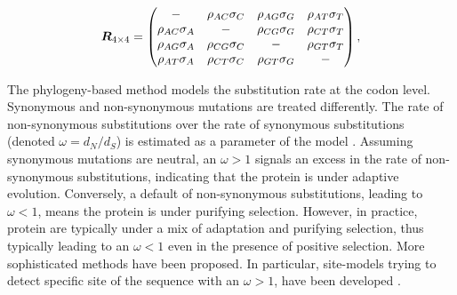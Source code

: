 \begin{equation}
\label{eq:mutrates}
\bm{R}_{4\times4} = \begin{pmatrix}
- & {\rho_{AC} \sigma_C} & {\rho_{AG}\sigma_G} & {\rho_{AT}\sigma_T} \\ 
{\rho_{AC}\sigma_A} & - & {\rho_{CG}\sigma_G} & {\rho_{CT}\sigma_T} \\ 
{\rho_{AG}\sigma_A} & {\rho_{CG}\sigma_C} & - & {\rho_{GT}\sigma_T} \\ 
{\rho_{AT}\sigma_A} & {\rho_{CT}\sigma_C} & {\rho_{GT}\sigma_G} & - 
\end{pmatrix},
\end{equation}

The phylogeny-based method models the \gls{substitution} rate at the \gls{codon} level. Synonymous and non-synonymous mutations are treated differently. The rate of non-synonymous substitutions over the rate of synonymous substitutions (denoted $\omega=d_N/d_S$) is estimated as a parameter of the model \citep{Muse1994,Goldman1994}. Assuming synonymous mutations are \gls{neutral}, an $\omega>1$ signals an excess in the rate of non-synonymous substitutions, indicating that the protein is under adaptive evolution. Conversely, a default of non-synonymous substitutions, leading to $\omega<1$, means the protein is under purifying selection. However, in practice, protein are typically under a mix of adaptation and purifying selection, thus typically leading to an $\omega<1$ even in the presence of positive selection. More sophisticated methods have been proposed. In particular, site-models trying to detect specific site of the sequence with an $\omega>1$, have been developed \citep{Yang2001, kosiol_patterns_2008}.


